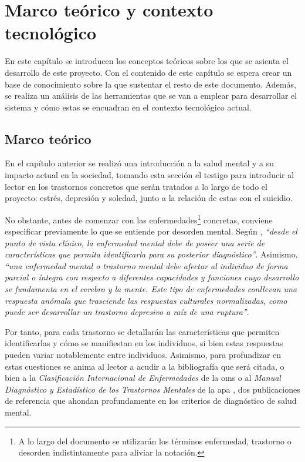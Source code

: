 \chapter{Marco teórico y contexto tecnológico}
\label{chapter:marco_teorico}


En este capítulo se introducen los conceptos teóricos sobre los que se asienta el desarrollo de este proyecto. Con el contenido de este capítulo se espera crear un base de conocimiento sobre la que sustentar el resto de este documento. Además, se realiza un análisis de las herramientas que se van a emplear para desarrollar el sistema y cómo estas se encuadran en el contexto tecnológico actual.

\section{Marco teórico}
    \label{section:marco_teorico}

    En el capítulo anterior se realizó una introducción a la salud mental y a su impacto actual en la sociedad, tomando esta sección el testigo para introducir al lector en los trastornos concretos que serán tratados a lo largo de todo el proyecto: estrés, depresión y soledad, junto a la relación de estas con el suicidio.

    No obstante, antes de comenzar con las enfermedades\footnote{A lo largo del documento se utilizarán los términos enfermedad, trastorno o desorden indistintamente para aliviar la notación.} concretas, conviene especificar previamente lo que se entiende por desorden mental. Según \cite{ortega_gonzalez_enfermedades_2021}, \textit{``desde el punto de vista clínico, la enfermedad mental debe de poseer una serie de características que permita identificarla para su posterior diagnóstico''}. Asimismo, \textit{``una enfermedad mental o trastorno mental debe afectar al individuo de forma parcial o íntegra con respecto a diferentes capacidades y funciones cuyo desarrollo se fundamenta en el cerebro y la mente. Este tipo de enfermedades conllevan una respuesta anómala que trasciende las respuestas culturales normalizadas, como puede ser desarrollar un trastorno depresivo a raíz de una ruptura''}.

    Por tanto, para cada trastorno se detallarán las características que permiten identificarlas y cómo se manifiestan en los individuos, si bien estas respuestas pueden variar notablemente entre individuos. Asimismo, para profundizar en estas cuestiones se anima al lector a acudir a la bibliografía que será citada, o bien a la \textit{Clasificación Internacional de Enfermedades} de la \gls{oms} \cite{oms_clasificacion_nodate} o al \textit{Manual Diagnóstico y Estadístico de los Trastornos Mentales} de la \gls{apa} \cite{american_psychological_association_manual_2014}, dos publicaciones de referencia que ahondan profundamente en los criterios de diagnóstico de salud mental.


